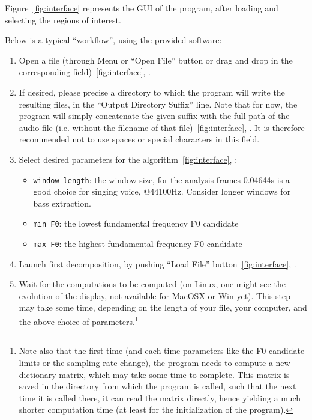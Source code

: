 \documentclass{article}
\newcommand\circled[1]{\raisebox{.5pt}{\textcircled{\raisebox{-.9pt} {#1}}}}
\begin{document}
Figure~\ref{fig:interface} represents the GUI of the program, after loading and selecting the regions of interest. 

Below is a typical ``workflow'', using the provided software:

\begin{enumerate}
\item Open a file (through Menu or ``Open File'' button or drag and drop
   in the corresponding field)~\ref{fig:interface}, \circled{1}.

\item If desired, please precise a directory to which the program will write
   the resulting files, in the ``Output Directory Suffix'' line. 
   Note that for now, the program will simply concatenate the given suffix
   with the full-path of the audio file (i.e. without the filename of that 
   file)~\ref{fig:interface}, \circled{1}. It is therefore recommended not 
   to use spaces or special characters in this field.

\item Select desired parameters for the algorithm~\ref{fig:interface}, \circled{2}:
\begin{itemize}
\item \texttt{window length}: the window size, for the analysis frames
        0.04644s is a good choice for singing voice, @44100Hz.
        Consider longer windows for bass extraction.
\item \texttt{min F0}: the lowest fundamental frequency F0 candidate
\item \texttt{max F0}: the highest fundamental frequency F0 candidate
\end{itemize}

\item Launch first decomposition, by pushing ``Load File'' button~\ref{fig:interface}, \circled{3}.

\item Wait for the computations to be computed (on Linux, one might
   see the evolution of the display, not available for MacOSX or Win yet). This step may take some time, depending on the length of your file, your computer, and the above choice of parameters.\footnote{Note also that the first time (and each time parameters like the F0 candidate limits or the sampling rate change), the program needs to compute a new dictionary matrix, which may take some time to complete. This matrix is saved in the directory from which the program is called, such that the next time it is called there, it can read the matrix directly, hence yielding a much shorter computation time (at least for the initialization of the program).}


\end{enumerate}
\end{document}
